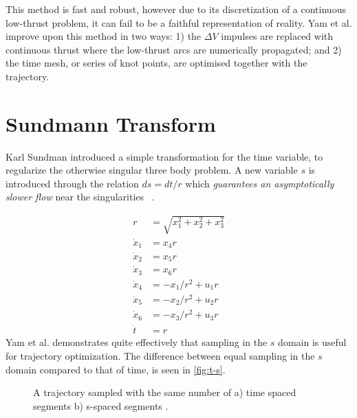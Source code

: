This method is fast and robust, however due to its discretization of a
continuous low-thrust problem, it can fail to be a faithful representation of
reality. Yam et al. improve upon this method in two ways: 1) the $\Delta{V}$
impulses are replaced with continuous thrust where the low-thrust arcs are
numerically propagated; and 2) the time mesh, or series of knot points, are
optimised together with the trajectory.

\section{Sundmann Transform\label{sec:sundmann}}
Karl Sundman introduced a simple transformation for the time variable, to
regularize the otherwise singular three body problem. A new variable $s$ is
introduced through the relation $ds=dt/r$ which \textit{guarantees an
asymptotically slower flow} near the singularities ~\cite{Sundman1913}.

\begin{equation}
    \begin{aligned}
        r&=\sqrt{x_1 ^2 + x_2 ^ 2 + x_3 ^ 2}\\
        \dot{x}_1 &= x_{4}r\\
        \dot{x}_2 &= x_{5}r\\
        \dot{x}_3 &= x_{6}r\\
        \dot{x}_4 &= -x_{1}/r^2+u_1{r}\\
        \dot{x}_5 &= -x_{2}/r^2+u_2{r}\\
        \dot{x}_6 &= -x_{3}/r^2+u_3{r}\\
        \dot{t} &= r
    \end{aligned}
\end{equation}
Yam et al. demonstrates quite effectively that sampling in the $s$ domain is
useful for trajectory optimization. \cite{Yam2010} The difference between equal
sampling in the $s$ domain compared to that of time, is seen in \autoref{fig:t-s}.

\begin{figure}[htp]
    \centering
    \label{fig:t-s}
    \caption{
        A trajectory sampled with the same number of a) time spaced segments b)
        s-spaced segments \cite{Yam2010}.
    }
\end{figure}

